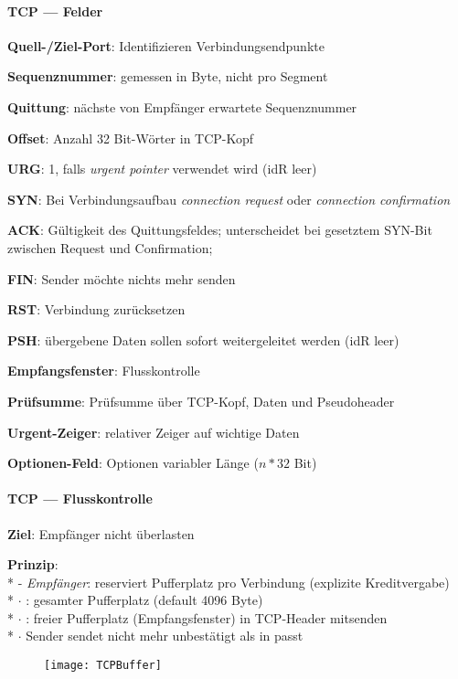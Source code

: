 \paragraph{TCP --- Felder}
\begin{items}
  \item \textbf{Quell-/Ziel-Port}: Identifizieren Verbindungsendpunkte
  \item \textbf{Sequenznummer}: gemessen in Byte, nicht pro Segment
  \item \textbf{Quittung}: nächste von Empfänger erwartete Sequenznummer
  \item \textbf{Offset}: Anzahl 32 Bit-Wörter in TCP-Kopf
  \item \textbf{URG}: 1, falls \emph{urgent pointer} verwendet wird (idR leer)
  \item \textbf{SYN}: Bei Verbindungsaufbau \emph{connection request} oder \emph{connection confirmation}
  \item \textbf{ACK}: Gültigkeit des Quittungsfeldes; unterscheidet bei gesetztem SYN-Bit zwischen Request und Confirmation; 
  \item \textbf{FIN}: Sender möchte nichts mehr senden
  \item \textbf{RST}: Verbindung zurücksetzen
  \item \textbf{PSH}: übergebene Daten sollen sofort weitergeleitet werden (idR leer)
  \item \textbf{Empfangsfenster}: Flusskontrolle
  \item \textbf{Prüfsumme}: Prüfsumme über TCP-Kopf, Daten und Pseudoheader
  \item \textbf{Urgent-Zeiger}: relativer Zeiger auf wichtige Daten
  \item \textbf{Optionen-Feld}: Optionen variabler Länge ($n * 32$ Bit)
\end{items}

\paragraph{TCP --- Flusskontrolle}
\begin{items}
  \item \textbf{Ziel}: Empfänger nicht überlasten
  \item \textbf{Prinzip}: \\*
    - \emph{Empfänger}: reserviert Pufferplatz pro Verbindung (explizite Kreditvergabe) \\*
    \phantom{-} \( \cdot \) : gesamter Pufferplatz (default 4096 Byte) \\*
    \phantom{-} \( \cdot \) : freier Pufferplatz (Empfangsfenster) in TCP-Header mitsenden \\*
    \phantom{-} \( \cdot \) Sender sendet nicht mehr unbestätigt als in  passt
\end{items}
\begin{figure}[H]\centering\label{TCPBuffer}\texttt{[image: TCPBuffer]}\end{figure}

